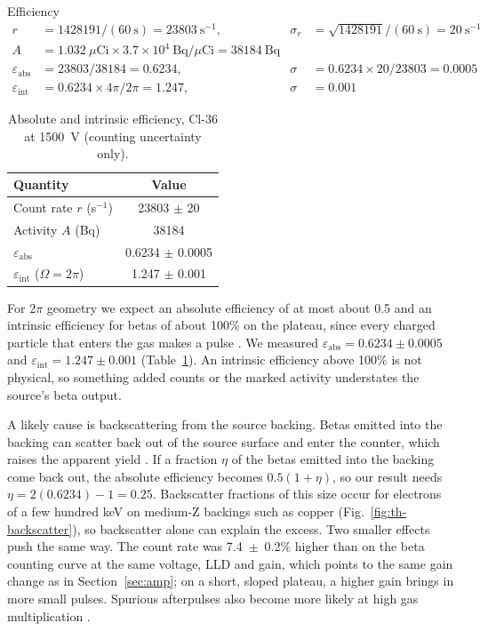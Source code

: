 \documentclass[12pt]{article}
\begin{document}
\begin{samplecalc}{Efficiency}
\begin{align*}
r &= 1428191/(60\ \text{s}) = 23803\ \text{s}^{-1}, & \sigma_r &= \sqrt{1428191}/(60\ \text{s}) = 20\ \text{s}^{-1}\\
A &= 1.032\ \mu\text{Ci} \times 3.7\times10^{4}\ \text{Bq}/\mu\text{Ci} = 38184\ \text{Bq} & &\\
\varepsilon_{\text{abs}} &= 23803/38184 = 0.6234, & \sigma &= 0.6234 \times 20/23803 = 0.0005\\
\varepsilon_{\text{int}} &= 0.6234 \times 4\pi/2\pi = 1.247, & \sigma &= 0.001
\end{align*}
\end{samplecalc}
 
\begin{table}[!htbp]
\centering\small
\begin{tabular}{lc}
\toprule
\textbf{Quantity} & \textbf{Value} \\
\midrule
Count rate $r$ (s$^{-1}$) & 23803 $\pm$ 20 \\
Activity $A$ (Bq) & 38184 \\
$\varepsilon_{\text{abs}}$ & 0.6234 $\pm$ 0.0005 \\
$\varepsilon_{\text{int}}$ ($\Omega = 2\pi$) & 1.247 $\pm$ 0.001 \\
\bottomrule
\end{tabular}
\caption{Absolute and intrinsic efficiency, Cl-36 at 1500~V (counting uncertainty only).}
\label{tab:eff}
\end{table}
 
For $2\pi$ geometry we expect an absolute efficiency of at most about 0.5 and an intrinsic efficiency for betas of about 100\% on the plateau, since every charged particle that enters the gas makes a pulse \cite{knoll}. We measured $\varepsilon_{\text{abs}} = 0.6234 \pm 0.0005$ and $\varepsilon_{\text{int}} = 1.247 \pm 0.001$ (Table~\ref{tab:eff}). An intrinsic efficiency above 100\% is not physical, so something added counts or the marked activity understates the source's beta output.
 
A likely cause is backscattering from the source backing. Betas emitted into the backing can scatter back out of the source surface and enter the counter, which raises the apparent yield \cite{knoll}. If a fraction $\eta$ of the betas emitted into the backing come back out, the absolute efficiency becomes $0.5(1+\eta)$, so our result needs $\eta = 2(0.6234) - 1 = 0.25$. Backscatter fractions of this size occur for electrons of a few hundred keV on medium-Z backings such as copper (Fig.~\ref{fig:th-backscatter}), so backscatter alone can explain the excess. Two smaller effects push the same way. The count rate was 7.4~$\pm$~0.2\% higher than on the beta counting curve at the same voltage, LLD and gain, which points to the same gain change as in Section~\ref{sec:amp}; on a short, sloped plateau, a higher gain brings in more small pulses. Spurious afterpulses also become more likely at high gas multiplication \cite{knoll}.
 
\end{document}
